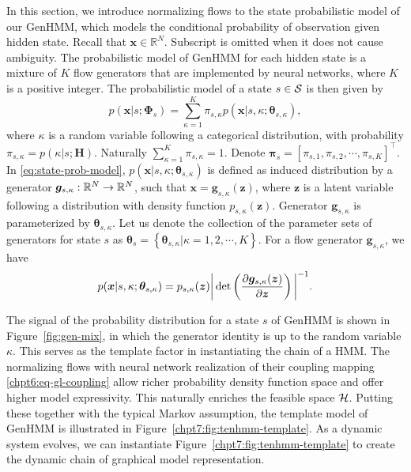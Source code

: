 In this section, we introduce normalizing flows to the state probabilistic model of our GenHMM, which models the conditional probability of observation given hidden state.
Recall that $\bm{x}\in\mathbb{R}^N$. Subscript is omitted when it does not cause ambiguity.
The probabilistic model of GenHMM for each hidden state is a mixture of $K$ flow generators that are implemented by neural networks, where $K$ is a positive integer.
The probabilistic model of a state $s\in\mathcal{S}$ is then given by
\begin{equation}\label{eq:state-prob-model}
  p(\bm{x}| s; \bm{\Phi}_{s}) = \sum_{\kappa=1}^{K}\pi_{s, \kappa} p(\bm{x}| s, \kappa; \bm{\theta}_{s, \kappa}),
\end{equation}
where $\kappa$ is a random variable following a categorical distribution, with probability $\pi_{s, \kappa} = p(\kappa | s; \bm{H})$.
Naturally $\sum_{\kappa = 1}^{K} \pi_{s, \kappa}= 1$. Denote $\bm{\pi}_{s} = [\pi_{s,1}, \pi_{s,2}, \cdots, \pi_{s,K}]^{\intercal}$. 
In \eqref{eq:state-prob-model}, $p(\bm{x}| s, \kappa; \bm{\theta}_{s, \kappa})$ is defined as induced distribution by a generator $\bm{g}_{s,\kappa}: \mathbb{R}^{N}\rightarrow\mathbb{R}^{N}$, such that $\bm{x}=\bm{g}_{s, \kappa}(\bm{z})$, where $\bm{z}$ is a latent variable following a distribution with density function $p_{s,\kappa}(\bm{z})$. Generator $\bm{g}_{s,\kappa}$ is parameterized by $\bm{\theta}_{s, \kappa}$. Let us denote the collection of the parameter sets of generators for state $s$ as $\bm{\theta}_s = \left\{ \bm{\theta}_{s, \kappa}| \kappa = 1, 2, \cdots, K \right\}$. For a flow generator $\bm{g}_{s, \kappa}$, we have
\begin{equation}\label{chpt7:eq:change-variable}
  p(\bm{x}| s, \kappa; \bm{\theta}_{s, \kappa}) = p_{s,\kappa}(\bm{z})\bigg| \det\left( \frac{ \partial \bm{g}_{s,\kappa}(\bm{z})}{\partial \bm{z}} \right)\bigg|^{-1}.
\end{equation}

The signal of the probability distribution for a state $s$ of GenHMM is shown in Figure~\ref{fig:gen-mix}, in which the generator identity is up to the random variable $\kappa$. This serves as the template factor in instantiating the chain of a HMM. The normalizing flows with neural network realization of their coupling mapping \eqref{chpt6:eq-gl-coupling} allow richer probability density function space and offer higher model expressivity. This naturally enriches the feasible space $\mathcal{H}$. Putting these together with the typical Markov assumption, the template model of GenHMM is illustrated in Figure~\ref{chpt7:fig:tenhmm-template}. As a dynamic system evolves, we can instantiate Figure~\ref{chpt7:fig:tenhmm-template} to create the dynamic chain of graphical model representation.

